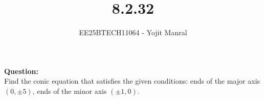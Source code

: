 \documentclass[journal]{IEEEtran}
\begin{document}

\vspace{3cm}

\title{8.2.32}
\author{EE25BTECH11064 - Yojit Manral}

\maketitle
{\let\newpage\relax\maketitle}
\renewcommand{\thefigure}{\theenumi}
\renewcommand{\thetable}{\theenumi}
\setlength{\intextsep}{10pt} %

\textbf{Question:}\\
Find the conic equation that satisfies the given conditions: ends of the major axis $(0,\pm5)$, ends of the minor axis $(\pm1,0)$.
\end{document}
